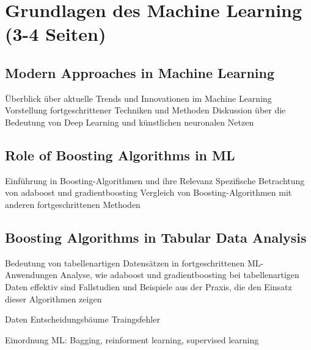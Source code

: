 \section{Grundlagen des Machine Learning (3-4 Seiten)}
\subsection{Modern Approaches in Machine Learning}
Überblick über aktuelle Trends und Innovationen im Machine Learning
Vorstellung fortgeschrittener Techniken und Methoden
Diskussion über die Bedeutung von Deep Learning und künstlichen neuronalen Netzen
\subsection{Role of Boosting Algorithms in ML}
Einführung in Boosting-Algorithmen und ihre Relevanz
Spezifische Betrachtung von \gls{adaboost} und \gls{gradientboosting}
Vergleich von Boosting-Algorithmen mit anderen fortgeschrittenen Methoden
\subsection{Boosting Algorithms in Tabular Data Analysis}
Bedeutung von tabellenartigen Datensätzen in fortgeschrittenen ML-Anwendungen
Analyse, wie \gls{adaboost} und \gls{gradientboosting} bei tabellenartigen Daten effektiv sind
Fallstudien und Beispiele aus der Praxis, die den Einsatz dieser Algorithmen zeigen

Daten
Entscheidungsbäume
Traingsfehler


Einordnung ML: Bagging, reinforment learning, supervised learning